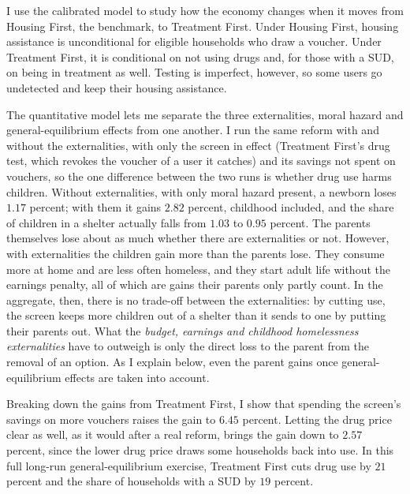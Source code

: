 \documentclass[10pt]{article}
\begin{document}
I use the calibrated model to study how the economy changes when it moves from Housing First, the benchmark, to Treatment First. Under Housing First, housing assistance is unconditional for eligible households who draw a voucher. Under Treatment First, it is conditional on not using drugs and, for those with a SUD, on being in treatment as well. Testing is imperfect, however, so some users go undetected and keep their housing assistance.

The quantitative model lets me separate the three externalities, moral hazard and general-equilibrium effects from one another. I run the same reform with and without the externalities, with only the screen in effect (Treatment First's drug test, which revokes the voucher of a user it catches) and its savings not spent on vouchers, so the one difference between the two runs is whether drug use harms children. Without externalities, with only moral hazard present, a newborn loses $1.17$ percent; with them it gains $2.82$ percent, childhood included, and the share of children in a shelter actually falls from $1.03$ to $0.95$ percent. The parents themselves lose about as much whether there are externalities or not.  However, with externalities the children gain more than the parents lose. They consume more at home and are less often homeless, and they start adult life without the earnings penalty, all of which are gains their parents only partly count.  In the aggregate, then, there is no trade-off between the externalities: by cutting use, the screen keeps more children out of a shelter than it sends to one by putting their parents out. What the \emph{budget, earnings and childhood homelessness externalities} have to outweigh is only the direct loss to the parent from the removal of an option. As I explain below, even the parent gains once general-equilibrium effects are taken into account.

Breaking down the gains from Treatment First, I show that spending the screen's savings on more vouchers raises the gain to $6.45$ percent. Letting the drug price clear as well, as it would after a real reform, brings the gain down to $2.57$ percent, since the lower drug price draws some households back into use. In this full long-run general-equilibrium exercise, Treatment First cuts drug use by $21$ percent and the share of households with a SUD by $19$ percent.
\end{document}
